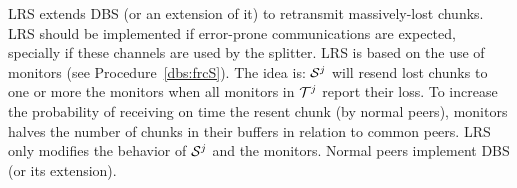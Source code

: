 LRS extends DBS (or an extension of it) to retransmit massively-lost
chunks. LRS should be implemented if error-prone communications are
expected, specially if these channels are used by the splitter. LRS is
based on the use of monitors (see Procedure~\ref{dbs:frcS}). The idea
is: ${\cal S}^j$ will resend lost chunks to one or more the monitors
when all monitors in ${\cal T}^j$ report their loss. To increase the
probability of receiving on time the resent chunk (by normal peers),
monitors halves the number of chunks in their buffers in relation to
common peers. LRS only modifies the behavior of ${\cal S}^j$ and the
monitors. Normal peers implement DBS (or its extension).

\begin{comment}
LRS should be used when it is expected to have loss-prone
communication links or when the bit-rate of the stream exceeds the
uploading capacity of the nodes. Notice that the impact of using LSR
for normal peers is null.

P2PSP relies in UDP to transmit the chunks, and obviously, packet
losses can happen. The impact of a packet loss in the QoS provided
depends on where the packets are lost and who lost it. If a packet is
lost in its trip between the splitter and a peer, this packet will be
missed by all the team.

\subsubsection{Monitor peers}
The overlay administrator can create some special peers called, in
short,\emph{monitors}. These peers are introduced to the rest of peers
of the team as normal peers and behave like the rest of well-intended
peers, churn included. Monitor peers can be asked by the splitter to
check whether the operation of the team has and is been correct.

\subsubsection{Selfish peers rejection}
Another functionality of monitors is to tell the splitter which chunks
have not been received on time (the consequence of receiving a lost
too late is the same than not receiving it never). The splitter
memorizes which chunk has been sent to each peer in the current
round. If all monitors reports that a chunk has been lost, the
splitter can determine which peer has been in charge of broadcasting
that chunk and take note of this. If this problem happens a given
number of times, the splitter can expell the unreliable peer from the
team by stop sending to it futher chunks.


\end{comment}
